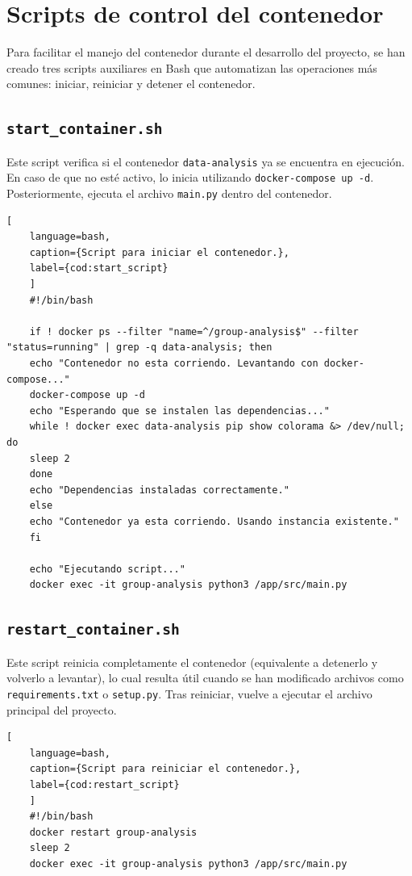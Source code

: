 \section{Scripts de control del contenedor}

Para facilitar el manejo del contenedor durante el desarrollo del proyecto, se han creado tres scripts auxiliares en Bash que automatizan las operaciones más comunes: iniciar, reiniciar y detener el contenedor.

\subsection{\texttt{start\_container.sh}}

Este script verifica si el contenedor \texttt{data-analysis} ya se encuentra en ejecución. En caso de que no esté activo, lo inicia utilizando \texttt{docker-compose up -d}. Posteriormente, ejecuta el archivo \texttt{main.py} dentro del contenedor.

\begin{lstlisting}[
	language=bash,
	caption={Script para iniciar el contenedor.},
	label={cod:start_script}
	]
	#!/bin/bash
	
	if ! docker ps --filter "name=^/group-analysis$" --filter "status=running" | grep -q data-analysis; then
	echo "Contenedor no esta corriendo. Levantando con docker-compose..."
	docker-compose up -d
	echo "Esperando que se instalen las dependencias..."
	while ! docker exec data-analysis pip show colorama &> /dev/null; do
	sleep 2
	done
	echo "Dependencias instaladas correctamente."
	else
	echo "Contenedor ya esta corriendo. Usando instancia existente."
	fi
	
	echo "Ejecutando script..."
	docker exec -it group-analysis python3 /app/src/main.py
\end{lstlisting}

\subsection{\texttt{restart\_container.sh}}

Este script reinicia completamente el contenedor (equivalente a detenerlo y volverlo a levantar), lo cual resulta útil cuando se han modificado archivos como \texttt{requirements.txt} o \texttt{setup.py}. Tras reiniciar, vuelve a ejecutar el archivo principal del proyecto.

\begin{lstlisting}[
	language=bash,
	caption={Script para reiniciar el contenedor.},
	label={cod:restart_script}
	]
	#!/bin/bash
	docker restart group-analysis
	sleep 2
	docker exec -it group-analysis python3 /app/src/main.py
\end{lstlisting}

